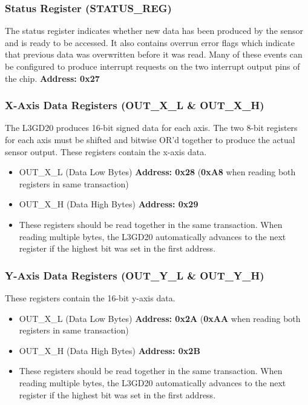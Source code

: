 \documentclass[openany,11pt,fleqn]{book} %
\begin{document}
\subsubsection{Status Register (STATUS\_REG)}
The status register indicates whether new data has been produced by the sensor and is ready to be accessed. It also contains overrun error flags which indicate that previous data was overwritten before it was read. Many of these events can be configured to produce interrupt requests on the two interrupt output pins of the chip. \textbf{Address: 0x27}

\subsubsection{X-Axis Data Registers (OUT\_X\_L \& OUT\_X\_H)}
The L3GD20 produces 16-bit signed data for each axis. The two 8-bit registers for each axis must be shifted and bitwise OR'd together to produce the actual sensor output. These registers contain the x-axis data. 
\begin{itemize}
    \item OUT\_X\_L (Data Low Bytes) \textbf{Address: 0x28} (\textbf{0xA8} when reading both registers in same transaction)
    \item OUT\_X\_H (Data High Bytes) \textbf{Address: 0x29}
    \item These registers should be read together in the same transaction. When reading multiple bytes, the L3GD20 automatically advances to the next register if the highest bit was set in the first address. 
\end{itemize} 

\subsubsection{Y-Axis Data Registers (OUT\_Y\_L \& OUT\_Y\_H)}
These registers contain the 16-bit y-axis data. 
\begin{itemize}
    \item OUT\_X\_L (Data Low Bytes) \textbf{Address: 0x2A} (\textbf{0xAA} when reading both registers in same transaction)
    \item OUT\_X\_H (Data High Bytes) \textbf{Address: 0x2B}
    \item These registers should be read together in the same transaction. When reading multiple bytes, the L3GD20 automatically advances to the next register if the highest bit was set in the first address. 
\end{itemize}
\end{document}
